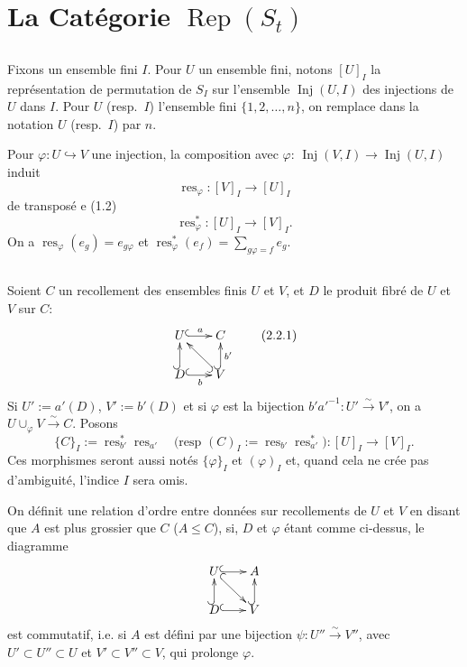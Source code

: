 \documentclass[11pt,a4paper]{article}
\theoremstyle{plain}
\theoremstyle{definition}
\DeclareMathOperator{\Rep}{Rep}
\DeclareMathOperator{\Inj}{Inj}
\DeclareMathOperator{\res}{res}
\newcommand{\isom}{\xrightarrow{\sim}}
\newcommand{\inj}{\hookrightarrow}
\begin{document}
\section{La Cat\'egorie $\Rep(S_t)$}

\subsection{}
Fixons un ensemble fini $I$. Pour $U$ un ensemble fini, notons $[U]_I$ la repr\'esentation de permutation de $S_I$ sur l'ensemble $\Inj(U, I)$ des injections de $U$ dans $I$. Pour $U$ (resp.~$I$) l'ensemble fini $\{1, 2, \ldots, n\}$, on remplace dans la notation $U$ (resp.~$I$) par $n$.

Pour $\varphi : U \inj V$ une injection, la composition avec $\varphi$: $\Inj(V, I) \to \Inj(U, I)$ induit
\[
\res_\varphi : [V]_I \to [U]_I
\]
de transpos\'e e (1.2)
\[
\res^*_\varphi : [U]_I \to [V]_I.
\]
On a $\res_\varphi(e_g) = e_{g\varphi}$ et $\res^*_\varphi(e_f) = \sum_{g\varphi = f} e_g$.

\subsection{}
Soient $C$ un recollement des ensembles finis $U$ et $V$, et $D$ le produit fibr\'e de $U$ et $V$ sur $C$:
\begin{equation}
\xymatrix@R=1.5pc@C=1.5pc{
U \ar@{^{(}->}[r]^{a} & C \\
D \ar@{^{(}->}[u] \ar@{^{(}->}[r]_{b} & V \ar@{^{(}->}[u]_{b'}
\ar@{^{(}->}[ul]
} \tag{2.2.1}
\end{equation}
Si $U' := a'(D)$, $V' := b'(D)$ et si $\varphi$ est la bijection $b' a'^{-1} : U' \isom V'$, on a $U \cup_\varphi V \isom C$. Posons
\[
\{C\}_I := \res^*_{b'} \res_{a'} \quad \text{(resp } (C)_I := \res_{b'} \res^*_{a'} \text{)} : [U]_I \longrightarrow [V]_I.
\]
Ces morphismes seront aussi not\'es $\{\varphi\}_I$ et $(\varphi)_I$ et, quand cela ne cr\'ee pas d'ambiguit\'e, l'indice $I$ sera omis.

On d\'efinit une relation d'ordre entre donn\'ees sur recollements de $U$ et $V$ en disant que $A$ est plus grossier que $C$ ($A \leq C$), si, $D$ et $\varphi$ \'etant comme ci-dessus, le diagramme
\[
\xymatrix@R=1.5pc@C=1.5pc{
U \ar@{^{(}->}[r] \ar@{^{(}->}[dr] & A \\
D \ar@{^{(}->}[u] \ar@{^{(}->}[r] & V \ar@{^{(}->}[u]
}
\]
est commutatif, i.e. si $A$ est d\'efini par une bijection $\psi : U'' \isom V''$, avec $U' \subset U'' \subset U$ et $V' \subset V'' \subset V$, qui prolonge $\varphi$.
\end{document}
